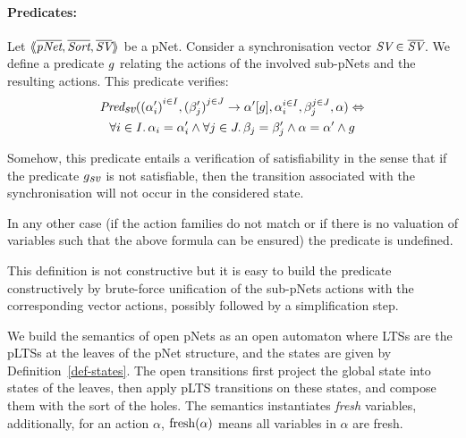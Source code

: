 \documentclass{llncs}
\begin{document}

\paragraph{Predicates:}
Let
$\mylangle\overline{\pNet},\overline{\Sort},\overline{\symb{SV}}\myrangle$
be a pNet. Consider a synchronisation vector $\symb{SV}\in \overline{\symb{SV}}$. We 
define a
predicate $g$ relating
the actions of the involved sub-pNets and the resulting actions. This predicate verifies:
\begin{multline}
\Predsv(\SV{{(\alpha'_i)}^{i\in I}, {(\beta'_j)}^{j\in J}} 
{\alpha'} {g}, \alpha_i^{i\in I}, \beta_j^{j\in J}, \alpha)\Leftrightarrow \\
\forall i\in I.\, \alpha_i=\alpha'_i\land \forall j \in J.\, \beta_j=\beta'_j \land 
\alpha=\alpha' 
\land g
\end{multline}


 

Somehow, this predicate entails a verification of satisfiability in the sense that if the 
predicate $\Pred_{\symb{sv}}$ is not satisfiable, then the transition associated with the 
synchronisation will not occur in the considered state. 


In any other case (if the action families do not match or if there is no valuation of
variables such that the above formula can be ensured) the predicate is undefined.

This definition is not constructive but it is easy to build the predicate constructively
by brute-force unification of the sub-pNets
actions with the corresponding vector actions, possibly followed by a simplification
step.


We build the semantics of open pNets as an open automaton where LTSs are the pLTSs at
the leaves of the pNet structure, and the states are given by 
Definition~\ref{def-states}. The open transitions first
 project the global state into states of the leaves, then apply
pLTS transitions on these states, and compose them with the sort of the holes. %
The semantics    instantiates \emph{fresh} variables, additionally, for an action 
$\alpha$, $\operatorname{fresh}(\alpha)$ means all variables in $\alpha$ are fresh.
\end{document}
